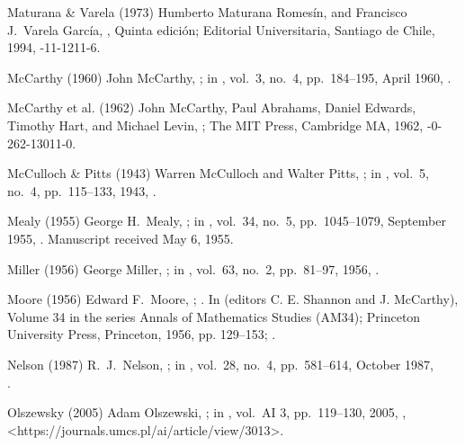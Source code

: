\biblabel Maturana \& Varela (1973)
Humberto Maturana Romesín, and
Francisco J.\ Varela García,
,
Quinta edición; Editorial Universitaria, Santiago de Chile, 1994,
-11-1211-6.

\biblabel McCarthy (1960)
John McCarthy,
;
in ,
vol.\ 3, no.\ 4, pp.\ 184--195, April 1960,
.

\biblabel McCarthy et al. (1962)
John McCarthy, Paul Abrahams, Daniel Edwards,
Timothy Hart, and Michael Levin,
 ;
The MIT Press, Cambridge MA, 1962,
-0-262-13011-0.

\biblabel McCulloch \& Pitts (1943)
Warren McCulloch and Walter Pitts,
;
in ,
vol.\ 5, no.\ 4, pp.\ 115--133, 1943,
.

\biblabel Mealy (1955)
George H.\ Mealy,
;
in ,
vol.\ 34, no.\ 5, pp.\ 1045--1079, September 1955,
.
Manuscript received May 6, 1955.

\biblabel Miller (1956)
George Miller,
;
in ,
vol.\ 63, no.\ 2, pp.\ 81--97, 1956,
.

\biblabel Moore (1956)
Edward F.\ Moore,
;
.
In 
(editors C. E. Shannon and J. McCarthy),
Volume 34 in the series Annals of Mathematics Studies (AM34);
Princeton University Press, Princeton, 1956, pp. 129--153;
.

\biblabel Nelson (1987)
R.\ J.\ Nelson,
;
in ,
vol.\ 28, no.\ 4, pp.\ 581--614, October 1987,\\
.

\biblabel Olszewsky (2005)
Adam Olszewski,
;
in ,
vol.\ AI 3, pp.\ 119--130, 2005,
,
\URL<https://journals.umcs.pl/ai/article/view/3013>.

